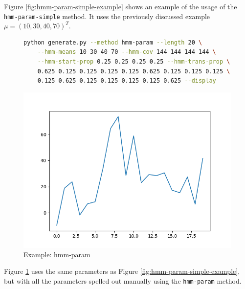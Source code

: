 Figure \ref{fig:hmm-param-simple-example} shows an example of the usage of the \texttt{hmm-param-simple} method. It uses the previously discussed example $\mu = (10, 30, 40, 70)^T$. 

\newpage

\begin{figure}
\begin{lstlisting}[language=bash]
    python generate.py --method hmm-param --length 20 \
    --hmm-means 10 30 40 70 --hmm-cov 144 144 144 144 \
    --hmm-start-prop 0.25 0.25 0.25 0.25 --hmm-trans-prop \
    0.625 0.125 0.125 0.125 0.125 0.625 0.125 0.125 0.125 \
    0.125 0.625 0.125 0.125 0.125 0.125 0.625 --display
\end{lstlisting}
\includegraphics[scale=0.7]{figures/hmm-param}
\caption{Example: hmm-param}    
\label{fig:hmm-param-example}
\end{figure}

Figure \ref{fig:hmm-param-example} uses the same parameters as Figure \ref{fig:hmm-param-simple-example}, but with all the parameters spelled out manually using the \texttt{hmm-param} method. 

\newpage

